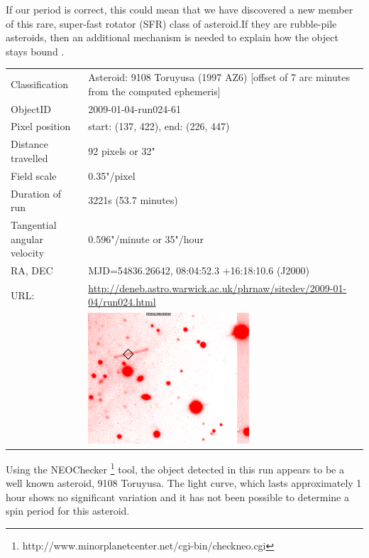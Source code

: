   If our period is correct, this could mean that we have discovered a new member of this rare, super-fast rotator (SFR) class of asteroid.If they are rubble-pile asteroids, then an additional mechanism is needed to explain how the object stays bound \cite{Holsapple2007}. 


  \newpage
  \begin{tabular}{l l}
  Classification & Asteroid: 9108 Toruyusa (1997 AZ6) [offset of 7 arc minutes from the computed ephemeris]\\
  ObjectID & 2009-01-04-run024-61 \\
  Pixel position & start: (137, 422), end: (226, 447) \\
  Distance travelled & 92 pixels or 32" \\
  Field scale & 0.35"/pixel \\
  Duration of run & 3221s (53.7 minutes) \\
  Tangential angular velocity & 0.596"/minute or 35"/hour\\ 
  RA, DEC & MJD=54836.26642, 08:04:52.3 +16:18:10.6 (J2000) \\
  URL: & \small \url{http://deneb.astro.warwick.ac.uk/phrnaw/sitedev/2009-01-04/run024.html} \\
       & \includegraphics[width=60mm]{images/2009-01-04-run024-61.png} \\
  \end{tabular}

  Using the NEOChecker \footnote{http://www.minorplanetcenter.net/cgi-bin/checkneo.cgi} tool, the object detected in this run appears to be a well known asteroid, 9108 Toruyusa. The light curve, which lasts approximately 1 hour shows no significant variation and it has not been possible to determine a spin period for this asteroid.  

  
